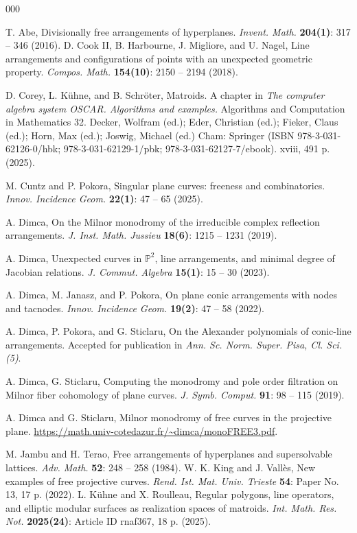 \documentclass[11pt]{article}
\theoremstyle{plain}
\theoremstyle{definition}
\theoremstyle{plain}
\begin{document}
\begin{thebibliography}{000}

T. Abe, Divisionally free arrangements of hyperplanes. \textit{Invent. Math.} \textbf{204(1)}: 317 -- 346 (2016).
D. Cook II, B. Harbourne, J. Migliore, and U. Nagel, Line arrangements and configurations of points with an unexpected geometric property. \textit{Compos. Math.} \textbf{154(10)}: 2150 -- 2194 (2018).

D. Corey, L. K\"uhne, and B. Schröter, Matroids. A chapter in \textit{The computer algebra system OSCAR. Algorithms and examples.} Algorithms and Computation in Mathematics 32. Decker, Wolfram (ed.); Eder, Christian (ed.); Fieker, Claus (ed.); Horn, Max (ed.); Joswig, Michael (ed.) Cham: Springer (ISBN 978-3-031-62126-0/hbk; 978-3-031-62129-1/pbk; 978-3-031-62127-7/ebook). xviii, 491 p. (2025).

M. Cuntz and P. Pokora, Singular plane curves: freeness and combinatorics. \textit{Innov. Incidence Geom.} \textbf{22(1)}: 47 -- 65 (2025).

A. Dimca, On the Milnor monodromy of the irreducible complex reflection arrangements. \textit{J. Inst. Math. Jussieu} \textbf{18(6)}: 1215 -- 1231 (2019).

A. Dimca, Unexpected curves in $\mathbb{P}^{2}$, line arrangements, and minimal degree of Jacobian relations. \textit{J. Commut. Algebra} \textbf{15(1)}: 15 -- 30 (2023).

A. Dimca, M. Janasz, and P. Pokora, On plane conic arrangements with nodes and tacnodes. \textit{Innov. Incidence Geom.} \textbf{19(2)}: 47 -- 58 (2022).

A. Dimca, P. Pokora, and G. Sticlaru, On the Alexander polynomials of conic-line arrangements. Accepted for publication in \textit{Ann. Sc. Norm. Super. Pisa, Cl. Sci. (5)}.

A. Dimca, G. Sticlaru, Computing the monodromy and pole order filtration on Milnor fiber cohomology of plane curves. \textit{J. Symb. Comput.} \textbf{91}: 98 -- 115 (2019).

A. Dimca and G. Sticlaru, Milnor monodromy of free curves in the projective plane. \url{https://math.univ-cotedazur.fr/~dimca/monoFREE3.pdf}.

M. Jambu and H. Terao, Free arrangements of hyperplanes and supersolvable lattices. \textit{Adv. Math.} \textbf{52}: 248 -- 258 (1984).
W. K. King and J. Vall\`es, New examples of free projective curves. \textit{Rend. Ist. Mat. Univ. Trieste} \textbf{54}: Paper No. 13, 17 p. (2022).
L. K\"uhne and X. Roulleau, Regular polygons, line operators, and elliptic modular surfaces as realization spaces of matroids. \textit{Int. Math. Res. Not.} \textbf{2025(24)}: Article ID rnaf367, 18 p. (2025).


\end{thebibliography}
\end{document}
